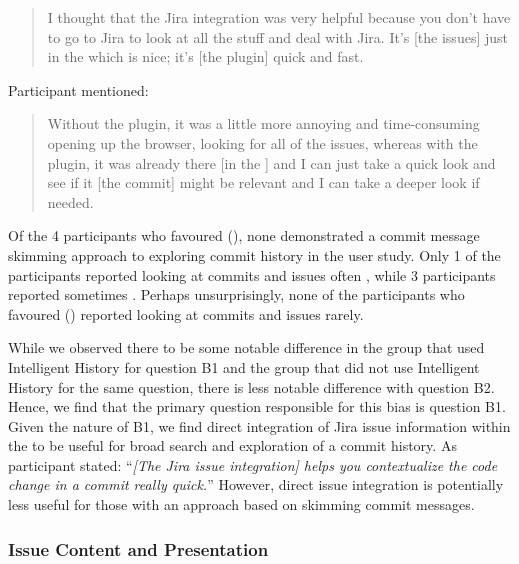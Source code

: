 \begin{quote}
  I thought that the Jira integration was very helpful because you don’t have to go to Jira to look at all the stuff and deal with Jira. 
  It’s [the issues] just in the  which is nice; it’s [the plugin] quick and fast.
\end{quote}

Participant  mentioned:

\begin{quote}
  Without the plugin, it was a little more annoying and time-consuming opening up the browser, 
  looking for all of the issues, 
  whereas with the plugin, 
  it was already there [in the ] and I can just take a quick look and see if it [the commit] 
  might be relevant and I can take a deeper look if needed.
\end{quote}

Of the 4 participants who favoured (), none demonstrated a commit message skimming approach to exploring commit history in the user study.
Only 1 of the participants reported looking at commits and issues often ,
while 3 participants reported sometimes .
Perhaps unsurprisingly, none of the participants who favoured () reported looking at commits and issues rarely.

While we observed there to be some notable difference in the group that used Intelligent History for question B1 and the group that did not use Intelligent History for the same question,
there is less notable difference with question B2.
Hence, we find that the primary question responsible for this bias is question B1.
Given the nature of B1, we find direct integration of Jira issue information within the  
to be useful for broad search and exploration of a commit history.
As participant  stated:
``\textit{[The Jira issue integration] helps you contextualize the code change in a commit really quick.}''
However, direct issue integration is potentially less useful for those with an approach based on skimming commit messages.

\subsubsection{Issue Content and Presentation}

